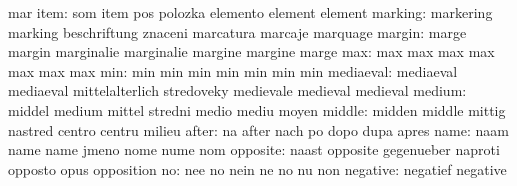                            mar
                     item: som                       item
                           pos                       polozka
                           elemento                  element
                           element
                  marking: markering                 marking
                           beschriftung              znaceni
                           marcatura                 marcaje
                           marquage
                   margin: marge                     margin
                           marginalie                marginalie
                           margine                   margine
                           marge
                      max: max                       max
                           max                       max
                           max                       max
                           max
                      min: min                       min
                           min                       min
                           min                       min
                           min
                mediaeval: mediaeval                 mediaeval
                           mittelalterlich           stredoveky
                           medievale                 medieval
                           medieval
                   medium: middel                    medium
                           mittel                    stredni
                           medio                     mediu
                           moyen
                   middle: midden                    middle
                           mittig                    nastred
                           centro                    centru
                           milieu
                    after: na                        after
                           nach                      po
                           dopo                      dupa
                           apres
                     name: naam                      name
                           name                      jmeno
                           nome                      nume
                           nom
                 opposite: naast                     opposite
                           gegenueber                naproti
                           opposto                   opus
                           opposition
                       no: nee                       no
                           nein                      ne
                           no                        nu
                           non
                 negative: negatief                  negative
